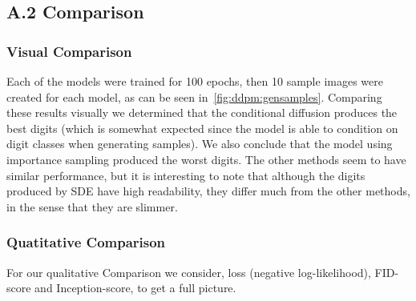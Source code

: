 \subsection{A.2 Comparison}

\subsubsection{Visual Comparison}
Each of the models were trained for 100 epochs, then 10 sample images were created for each model, as can be seen in~\cref{fig:ddpm:gensamples}.
Comparing these results visually we determined that the conditional diffusion produces the best digits (which is somewhat expected since the model is able to condition on digit classes when generating samples).
We also conclude that the model using importance sampling produced the worst digits. 
The other methods seem to have similar performance, but it is interesting to note that although the digits produced by SDE have high readability, they differ much from the other methods, in the sense that they are slimmer.


\subsubsection{Quatitative Comparison}
For our qualitative Comparison we consider, loss (negative log-likelihood), FID-score and Inception-score, to get a full picture.

